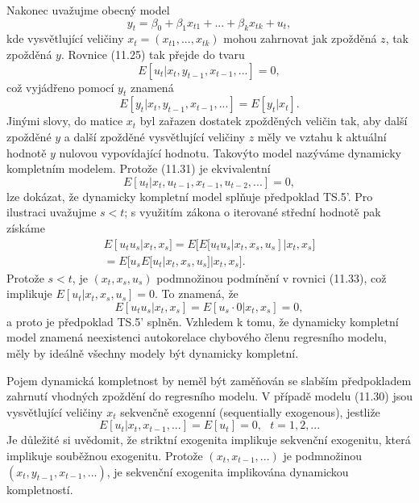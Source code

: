 Nakonec uvažujme obecný model
\begin{equation}
y_t = \beta_0 + \beta_1 x_{t1} + ... + \beta_k x_{tk} + u_t,
\end{equation}
kde vysvětlující veličiny $x_t = (x_{t1}, ..., x_{tk})$ mohou zahrnovat jak zpožděná $z$, tak zpožděná $y$. Rovnice (11.25) tak přejde do tvaru
\begin{equation}
E[u_t|x_t, y_{t - 1}, x_{t - 1}, ...] = 0,
\end{equation}
což vyjádřeno pomocí $y_t$ znamená
\begin{equation}
E[y_t | x_t, y_{t - 1}, x_{t - 1}, ...] = E[y_t | x_t].
\end{equation}
Jinými slovy, do matice $x_t$ byl zařazen dostatek zpožděných veličin tak, aby další zpožděné $y$ a další zpožděné vysvětlující veličiny $z$ měly ve vztahu k aktuální hodnotě $y$ nulovou vypovídající hodnotu. Takovýto model nazýváme dynamicky kompletním modelem. Protože (11.31) je ekvivalentní
\begin{equation}
E[u_t | x_t, u_{t - 1}, x_{t - 1}, u_{t - 2}, ...] = 0,
\end{equation}
lze dokázat, že dynamicky kompletní model splňuje předpoklad TS.5'. Pro ilustraci uvažujme $s < t$; s využitím zákona o iterované střední hodnotě pak získáme
\begin{multline}
  E[u_tu_s|x_t,x_s] = E\big[E[u_t u_s|x_t, x_s, u_s]|x_t, x_s\big]\\
  = E\big[u_sE[u_t|x_t, x_s, u_s]|x_t, x_s\big].
\end{multline}
Protože $s < t$, je $(x_t, x_s, u_s)$ podmnožinou podmínění v rovnici (11.33), což implikuje $E[u_t|x_t, x_s, u_s] = 0$. To znamená, že
\begin{equation}
E[u_t u_s | x_t, x_s] = E[u_s \cdot 0 | x_t, x_s] = 0,
\end{equation}
a proto je předpoklad TS.5' splněn. Vzhledem k tomu, že dynamicky kompletní model znamená neexistenci autokorelace chybového členu regresního modelu, měly by ideálně všechny modely být dynamicky kompletní.

Pojem dynamická kompletnost by neměl být zaměňován se slabším předpokladem zahrnutí vhodných zpoždění do regresního modelu. V případě modelu (11.30) jsou vysvětlující veličiny $x_t$ sekvenčně exogenní (sequentially exogenous), jestliže
\begin{equation}
E[u_t| x_t, x_{t - 1}, ...] = E[u_t] = 0, ~~~ t = 1, 2, ...
\end{equation}
Je důležité si uvědomit, že striktní exogenita implikuje sekvenční exogenitu, která implikuje souběžnou exogenitu. Protože $(x_t, x_{t - 1}, ...)$ je podmnožinou $(x_t, y_{t - 1}, x_{t - 1}, ...)$, je sekvenční exogenita implikována dynamickou kompletností.

